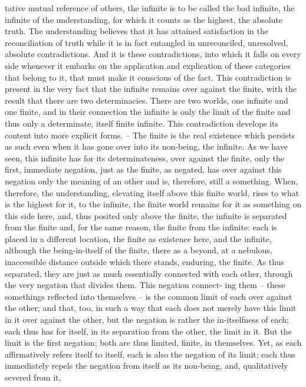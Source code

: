 tative mutual reference of others, the infinite is to be called the bad infinite,
the infinite of the understanding, for which it counts as the highest, the
absolute truth. The understanding believes that it has attained satisfaction
in the reconciliation of truth while it is in fact entangled in unreconciled,
unresolved, absolute contradictions. And it is these contradictions, into
which it falls on every side whenever it embarks on the application and
explication of these categories that belong to it, that must make it conscious
of the fact.
This contradiction is present in the very fact that the infinite remains
over against the finite, with the result that there are two determinacies.
There are two worlds, one infinite and one finite, and in their connection
the infinite is only the limit of the finite and thus only a determinate, itself
finite infinite.
This contradiction develops its content into more explicit forms. – The
finite is the real existence which persists as such even when it has gone
over into its non-being, the infinite. As we have seen, this infinite has
for its determinateness, over against the finite, only the first, immediate
negation, just as the finite, as negated, has over against this negation
only the meaning of an other and is, therefore, still a something. When,
therefore, the understanding, elevating itself above this finite world, rises
to what is the highest for it, to the infinite, the finite world remains for it
as something on this side here, and, thus posited only above the finite, the
infinite is separated from the finite and, for the same reason, the finite from
the infinite: each is placed in a different location, the finite as existence here,
and the infinite, although the being-in-itself of the finite, there as a beyond,
at a nebulous, inaccessible distance outside which there stands, enduring,
the finite.
As thus separated, they are just as much essentially connected with each
other, through the very negation that divides them. This negation connect-
ing them – these somethings reflected into themselves – is the common
limit of each over against the other; and that, too, in such a way that each
does not merely have this limit in it over against the other, but the negation
is rather the in-itselfness of each; each thus has for itself, in its separation
from the other, the limit in it. But the limit is the first negation; both are
thus limited, finite, in themselves. Yet, as each affirmatively refers itself to
itself, each is also the negation of its limit; each thus immediately repels
the negation from itself as its non-being, and, qualitatively severed from it,
